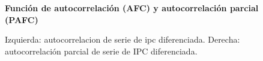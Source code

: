 %
\begin{figure}[h]
	\centering
	\textbf{Funci\'on de autocorrelaci\'on (AFC) y autocorrelaci\'on parcial (PAFC)}\par\medskip
	\caption{Izquierda: autocorrelacion de serie de ipc diferenciada. Derecha: autocorrelación parcial de serie de IPC diferenciada.}\label{fig22}
\end{figure}



